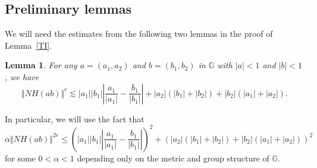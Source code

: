 \documentclass[11pt]{amsart}
\newtheorem{lemma}[theorem]{Lemma}
\theoremstyle{definition}
\numberwithin{theorem}{section} \numberwithin{equation}{section}
\begin{document}


\subsection{Preliminary lemmas}

We will need the estimates from the following two lemmas in the proof of Lemma~\ref{TI}.

\begin{lemma}
\label{NH}
For any $a = (a_1,a_2)$ and $b = (b_1,b_2)$ in $\mathbb{G}$ with $|a| < 1$ and $|b| < 1$, we have
$$
\Vert NH(ab) \Vert^r \lesssim |a_1||b_1|\left| \frac{a_1}{|a_1|} - \frac{b_1}{|b_1|} \right| + |a_2|(|b_1|+|b_2|) + |b_2|(|a_1| + |a_2|) .
$$
\end{lemma}

In particular, we will use the fact that 
\begin{equation}
\label{NHNormBd}
\alpha \Vert NH(ab) \Vert^{2r} \leq \left(|a_1||b_1|\left| \frac{a_1}{|a_1|} - \frac{b_1}{|b_1|} \right|\right)^2 + \left(|a_2|(|b_1|+|b_2|) + |b_2|(|a_1| + |a_2|)\right)^2
\end{equation}
for some $0 < \alpha < 1$ depending only on the metric and group structure of $\mathbb{G}$.
\end{document}
